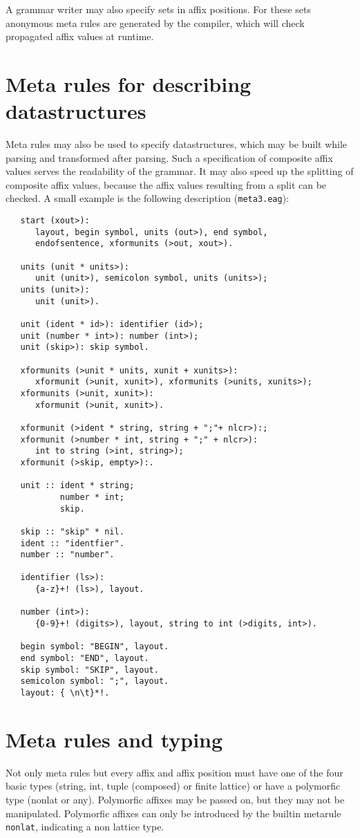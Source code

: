 A grammar writer may also specify sets in affix positions. For these
sets anonymous meta rules are generated by the compiler, which will
check propagated affix values at runtime.
\section {Meta rules for describing datastructures}
Meta rules may also be used to specify datastructures, which may
be built while parsing and transformed after parsing. Such a 
specification of composite affix values serves the readability
of the grammar. It may also speed up the splitting of composite
affix values, because the affix values resulting from a split
can be checked. A small example is the following description
({\tt meta3.eag}):
\begin{verbatim}
   start (xout>):
      layout, begin symbol, units (out>), end symbol,
      endofsentence, xformunits (>out, xout>).

   units (unit * units>):
      unit (unit>), semicolon symbol, units (units>);
   units (unit>):
      unit (unit>).

   unit (ident * id>): identifier (id>);
   unit (number * int>): number (int>);
   unit (skip>): skip symbol.

   xformunits (>unit * units, xunit + xunits>):
      xformunit (>unit, xunit>), xformunits (>units, xunits>);
   xformunits (>unit, xunit>):
      xformunit (>unit, xunit>).

   xformunit (>ident * string, string + ";"+ nlcr>):;
   xformunit (>number * int, string + ";" + nlcr>):
      int to string (>int, string>);
   xformunit (>skip, empty>):.

   unit :: ident * string;
           number * int;
           skip.

   skip :: "skip" * nil.
   ident :: "identfier".
   number :: "number".

   identifier (ls>):
      {a-z}+! (ls>), layout.

   number (int>):
      {0-9}+! (digits>), layout, string to int (>digits, int>).

   begin symbol: "BEGIN", layout.
   end symbol: "END", layout.
   skip symbol: "SKIP", layout.
   semicolon symbol: ";", layout.
   layout: { \n\t}*!.
\end{verbatim}
\section {Meta rules and typing}
Not only meta rules but every affix and affix position must have one
of the four basic types (string, int, tuple (composed) or finite lattice)
or have a polymorfic type (nonlat or any). Polymorfic affixes may be
passed on, but they may not be manipulated. Polymorfic affixes can only
be introduced by the builtin metarule {\tt nonlat}, indicating
a non lattice type.

